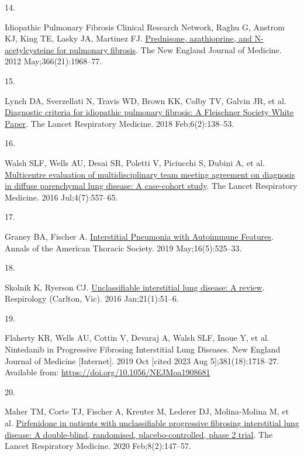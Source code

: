 \documentclass[
]{article}
\newlength{\cslhangindent}
\newlength{\csllabelwidth}
\newenvironment{CSLReferences}[2] %
 {\begin{list}{}{%
  \setlength{\itemindent}{0pt}
  \setlength{\leftmargin}{0pt}
  \setlength{\parsep}{0pt}
  \ifodd #1
   \setlength{\leftmargin}{\cslhangindent}
   \setlength{\itemindent}{-1\cslhangindent}
  \fi
  \setlength{\itemsep}{#2\baselineskip}}}
 {\end{list}}
\newcommand{\CSLLeftMargin}[1]{\parbox[t]{\csllabelwidth}{\strut#1\strut}}
\newcommand{\CSLRightInline}[1]{\parbox[t]{\linewidth - \csllabelwidth}{\strut#1\strut}}
\begin{document}
\begin{CSLReferences}{0}{1}
\CSLLeftMargin{14. }%
\CSLRightInline{Idiopathic Pulmonary Fibrosis Clinical Research Network, Raghu G, Anstrom KJ, King TE, Lasky JA, Martinez FJ. \href{https://doi.org/10.1056/NEJMoa1113354}{Prednisone, azathioprine, and {N}-acetylcysteine for pulmonary fibrosis}. The New England Journal of Medicine. 2012 May;366(21):1968--77. }

\CSLLeftMargin{15. }%
\CSLRightInline{Lynch DA, Sverzellati N, Travis WD, Brown KK, Colby TV, Galvin JR, et al. \href{https://doi.org/10.1016/S2213-2600(17)30433-2}{Diagnostic criteria for idiopathic pulmonary fibrosis: A {Fleischner} {Society} {White} {Paper}}. The Lancet Respiratory Medicine. 2018 Feb;6(2):138--53. }

\CSLLeftMargin{16. }%
\CSLRightInline{Walsh SLF, Wells AU, Desai SR, Poletti V, Piciucchi S, Dubini A, et al. \href{https://doi.org/10.1016/S2213-2600(16)30033-9}{Multicentre evaluation of multidisciplinary team meeting agreement on diagnosis in diffuse parenchymal lung disease: A case-cohort study}. The Lancet Respiratory Medicine. 2016 Jul;4(7):557--65. }

\CSLLeftMargin{17. }%
\CSLRightInline{Graney BA, Fischer A. \href{https://doi.org/10.1513/AnnalsATS.201808-565CME}{Interstitial {Pneumonia} with {Autoimmune} {Features}}. Annals of the American Thoracic Society. 2019 May;16(5):525--33. }

\CSLLeftMargin{18. }%
\CSLRightInline{Skolnik K, Ryerson CJ. \href{https://doi.org/10.1111/resp.12568}{Unclassifiable interstitial lung disease: {A} review}. Respirology (Carlton, Vic). 2016 Jan;21(1):51--6. }

\CSLLeftMargin{19. }%
\CSLRightInline{Flaherty KR, Wells AU, Cottin V, Devaraj A, Walsh SLF, Inoue Y, et al. Nintedanib in {Progressive} {Fibrosing} {Interstitial} {Lung} {Diseases}. New England Journal of Medicine {[}Internet{]}. 2019 Oct {[}cited 2023 Aug 5{]};381(18):1718--27. Available from: \url{https://doi.org/10.1056/NEJMoa1908681}}

\CSLLeftMargin{20. }%
\CSLRightInline{Maher TM, Corte TJ, Fischer A, Kreuter M, Lederer DJ, Molina-Molina M, et al. \href{https://doi.org/10.1016/S2213-2600(19)30341-8}{Pirfenidone in patients with unclassifiable progressive fibrosing interstitial lung disease: A double-blind, randomised, placebo-controlled, phase 2 trial}. The Lancet Respiratory Medicine. 2020 Feb;8(2):147--57. }


\end{CSLReferences}
\end{document}
